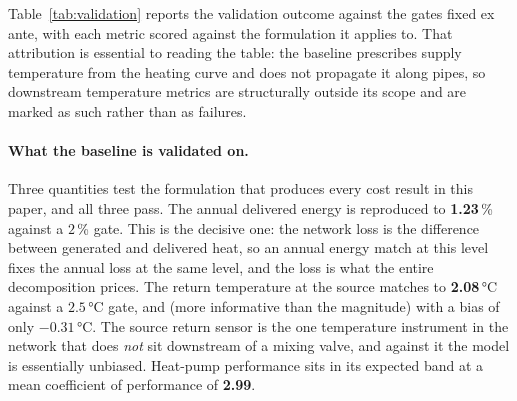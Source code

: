 
Table~\ref{tab:validation} reports the validation outcome against the gates fixed ex ante,
with each metric scored against the formulation it applies to. That attribution is
essential to reading the table: the baseline prescribes supply temperature from the heating
curve and does not propagate it along pipes, so downstream temperature metrics are
structurally outside its scope and are marked as such rather than as failures.

\paragraph{What the baseline is validated on.}
Three quantities test the formulation that produces every cost result in this paper, and
all three pass. The annual delivered energy is reproduced to \textbf{1.23}\,\% against a
$2$\,\% gate. This is the decisive one: the network loss is the difference between generated
and delivered heat, so an annual energy match at this level fixes the annual loss at the
same level, and the loss is what the entire decomposition prices. The return temperature at
the source matches to \textbf{2.08}\,°C against a $2.5$\,°C gate, and (more informative
than the magnitude) with a bias of only $-0.31$\,°C. The source return sensor is the one
temperature instrument in the network that does \emph{not} sit downstream of a mixing valve,
and against it the model is essentially unbiased. Heat-pump performance sits in its expected
band at a mean coefficient of performance of \textbf{2.99}.

